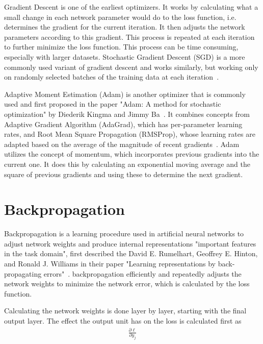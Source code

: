 Gradient Descent is one of the earliest optimizers.
It works by calculating what a small change in each network parameter would do to the loss function, i.e. determines the gradient for the current iteration.
It then adjusts the network parameters according to this gradient.
This process is repeated at each iteration to further minimize the loss function.
This process can be time consuming, especially with larger datasets.
Stochastic Gradient Descent (SGD) is a more commonly used variant of gradient descent and works similarly, but working only on randomly selected batches of the training data at each iteration~\cite{optimizer-intro}.

Adaptive Moment Estimation (Adam) is another optimizer that is commonly used and first proposed in the paper "Adam: A method for stochastic optimization" by Diederik Kingma and Jimmy Ba~\cite{adam}.
It combines concepts from Adaptive Gradient Algorithm (AdaGrad), which has per-parameter learning rates, and Root Mean Square Propagation (RMSProp), whose learning rates are adapted based on the average of the magnitude of recent gradients~\cite{adam}.
Adam utilizes the concept of momentum, which incorporates previous gradients into the current one.
It does this by calculating an exponential moving average and the square of previous gradients and using these to determine the next gradient.

\section{Backpropagation}\label{section:background-backpropagation}
Backpropagation is a learning procedure used in artificial neural networks to adjust network weights and produce internal representations "important features in the task domain", first described the David E. Rumelhart, Geoffrey E. Hinton, and Ronald J. Williams in their paper "Learning representations by back-propagating errors"~\cite{backprop}.
backpropagation efficiently and repeatedly adjusts the network weights to minimize the network error, which is calculated by the loss function.

Calculating the network weights is done layer by layer, starting with the final output layer.
The effect the output unit has on the loss is calculated first as
\begin{align}\label{eq:loss-1}
	\frac{\partial \ell}{\partial y_j}
\end{align}

